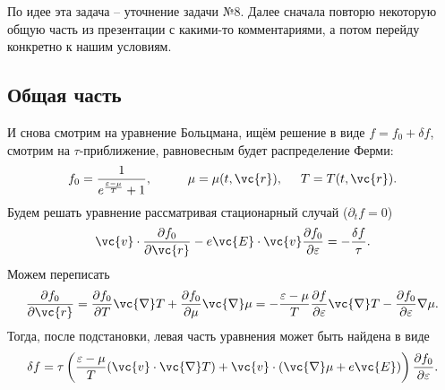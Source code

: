 По идее эта задача -- уточнение задачи №8. Далее сначала повторю некоторую общую часть из презентации  с какими-то комментариями, а потом перейду конкретно к нашим условиям.

\subsection*{Общая часть}

И снова смотрим на уравнение Больцмана, ищём решение в виде $f = f_0 + \delta f$, смотрим на $\tau$-приближение, равновесным будет распределение Ферми:
\begin{equation*}
	f_0 = \frac{1}{e^{\frac{\varepsilon-\mu}{T}} + 1},
	\hspace{10 mm} 
	\mu = \mu (t, \vc{r}),
	\hspace{5 mm} 
	T = T(t, \vc{r}).
\end{equation*}
Будем решать уравнение рассматривая стационарный случай ($\partial_t f = 0$)
\begin{equation*}
	\vc{v} \cdot \frac{\partial f_0}{\partial \vc{r}} - e \vc{E} \cdot \vc{v} \frac{\partial f_0}{\partial \varepsilon}  = - \frac{\delta f}{\tau}.
\end{equation*}
Можем переписать 
\begin{equation*}
	\frac{\partial f_0}{\partial \vc{r}} = \frac{\partial f_0}{\partial T}  \vc{\nabla} T + \frac{\partial f_0}{\partial \mu} \vc{\nabla} \mu = - \frac{\varepsilon-\mu}{T} \frac{\partial f}{\partial \varepsilon} \vc{\nabla} T - \frac{\partial f_0}{\partial \varepsilon} \nabla \mu.
\end{equation*}
Тогда, после подстановки, левая часть уравнения может быть найдена в виде
\begin{equation}
	\delta f = \tau \left(
		\frac{\varepsilon-\mu}{T} (\vc{v} \cdot \vc{\nabla} T) + \vc{v} \cdot (\vc{\nabla} \mu + e \vc{E})
	\right) \frac{\partial f_0}{\partial \varepsilon} .
\end{equation}


